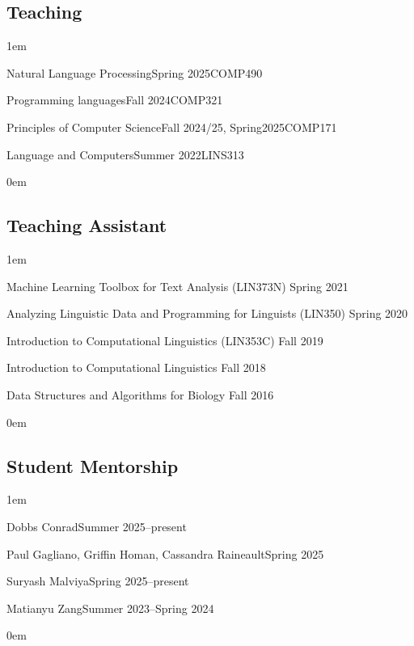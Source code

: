 \subsection{Teaching}
\leftskip1em\relax

  {Natural Language Processing}{Spring 2025}{COMP490}{}

  {Programming languages}{Fall 2024}{COMP321}{}
  
  {Principles of Computer Science}{Fall 2024/25, Spring2025}{COMP171}{}

  {Language and Computers}{Summer 2022}{LINS313}{}

\leftskip0em\relax
  
\subsection{Teaching Assistant}
\leftskip1em\relax
\vspace{0.6\baselineskip}

\textbullet\enspace Machine Learning Toolbox for Text Analysis ({\rmsc LIN373N}) \hfill Spring 2021

\textbullet\enspace Analyzing Linguistic Data and Programming for Linguists ({\rmsc LIN350}) \hfill Spring 2020

\textbullet\enspace Introduction to Computational Linguistics ({\rmsc LIN353C}) \hfill Fall 2019

\textbullet\enspace Introduction to Computational Linguistics \hfill Fall 2018

\textbullet\enspace Data Structures and Algorithms for Biology \hfill Fall 2016

\leftskip0em\relax

\subsection{Student Mentorship}
\leftskip1em\relax

  {\normalsize Dobbs Conrad}{\normalsize Summer 2025--present}{}{}

    {\normalsize Paul Gagliano, Griffin Homan, Cassandra Raineault}{\normalsize Spring 2025}{}{}
    
  {\normalsize Suryash Malviya}{\normalsize Spring 2025--present}{}{}
  
  {\normalsize Matianyu Zang}{\normalsize Summer 2023--Spring 2024}{}{}

\leftskip0em\relax
